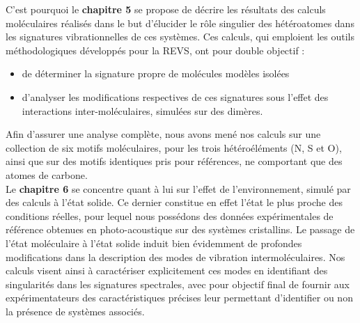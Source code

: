 	C'est pourquoi le \textbf{chapitre 5} se propose de décrire les résultats des calculs moléculaires réalisés dans le but d'élucider le rôle singulier des hétéroatomes dans les signatures vibrationnelles de ces systèmes. Ces calculs, qui emploient les outils méthodologiques développés pour la REVS, ont pour double objectif : 
	\begin{itemize}
	\item de déterminer la signature propre de molécules modèles isolées
	\item d'analyser les modifications respectives de ces signatures sous l'effet des interactions inter-moléculaires, simulées sur des dimères. 
	\end{itemize}

	Afin d'assurer une analyse complète, nous avons mené nos calculs sur une collection de six motifs moléculaires, pour les trois hétéroéléments (N, S et O), ainsi que sur des motifs identiques pris pour références, ne comportant que des atomes de carbone.\\


	Le \textbf{chapitre 6} se concentre quant à lui sur l'effet de l'environnement, simulé par des calculs à l'état solide. Ce dernier constitue en effet l'état le plus proche des conditions réelles, pour lequel nous possédons des données expérimentales de référence obtenues en photo-acoustique sur des systèmes cristallins. Le passage de l'état moléculaire à l'état solide induit bien évidemment de profondes modifications dans la description des modes de vibration intermoléculaires. Nos calculs visent ainsi à caractériser explicitement ces modes en identifiant des singularités dans les signatures spectrales, avec pour objectif final de fournir aux expérimentateurs des caractéristiques précises leur permettant d'identifier ou non la présence de systèmes associés. \\ 
	
